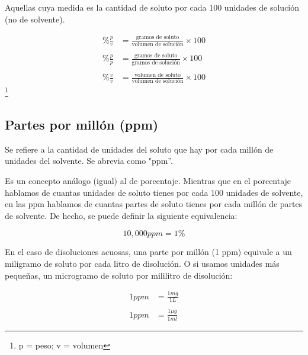 Aquellas cuya medida es la cantidad de soluto por cada 100 unidades de solución (no de solvente).

\begin{align*}
    \%\frac{p}{v} &= \frac{\text{gramos de soluto}}{\text{volumen de solución}} \times 100
    \\
    \\
    \%\frac{p}{p} &= \frac{\text{gramos de soluto}}{\text{gramos de solución}} \times 100
    \\
    \\
    \%\frac{v}{v} &= \frac{\text{volumen de soluto}}{\text{volumen de solución}} \times 100
\end{align*}\footnote{p = peso; v = volumen}

\subsection{Partes por millón (ppm)}

Se refiere a la cantidad de unidades del soluto que hay por cada millón de unidades del solvente. Se abrevia como "ppm”.

Es un concepto análogo (igual) al de porcentaje. Mientras que en el porcentaje hablamos de cuantas unidades de soluto tienes por cada 100 unidades de solvente, en las ppm hablamos de cuantas partes de soluto tienes por cada millón de partes de solvente. De hecho, se puede definir la siguiente equivalencia:

\begin{equation*}
    10,000ppm = 1\%
\end{equation*}

En el caso de disoluciones acuosas, una parte por millón (1 ppm) equivale a un miligramo de soluto por cada litro de disolución. O si usamos unidades más pequeñas, un microgramo de soluto por mililitro de disolución:

\begin{align*}
    1ppm &= \frac{1mg}{1L}
    \\
    \\
    1ppm &= \frac{1\mu g}{1ml}
\end{align*}
